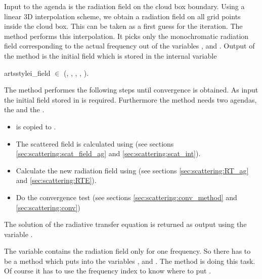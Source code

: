 
Input to the agenda is the radiation field on the cloud
box boundary.
Using a linear 3D interpolation scheme, we obtain a
radiation field on all grid points inside the cloud box.
This can be taken as a first guess for the iteration. The method
 performs this
interpolation. It picks only the monochromatic radiation field
corresponding to the actual frequency out of the variables
,  and
. Output of the method is the initial field 
which is stored in the internal variable
\begin{center}
  artsstyle{i\_field} $\in$ (\ScaP, \ScaLat, \ScaLon, \ScaZa,
\ScaAa). 
\end{center}


The method  performes the following steps 
until convergence is obtained. As input the initial field stored in
 is required. Furthermore the method needs two
agendas, the  and the
.

\begin{itemize}
\item {} is copied to .
\item The scattered field is calculated using
    (see sections \ref{sec:scattering:scat_field_ag} and
    \ref{sec:scattering:scat_int}).
\item Calculate the new radiation field using
 (see sections \ref{sec:scattering:RT_ag} and
  \ref{sec:scattering:RTE}).
\item Do the convergence test (see sections
  \ref{sec:scattering:conv_method} and \ref{sec:scattering:conv})
\end{itemize}
The solution of the radiative transfer equation is returned as output
using the variable . 

The variable  contains the radiation field only
for one frequency. So there has to be a method which puts
 into the variables ,
 and . The method
 is doing this task.
Of course it has to use the frequency index to know where
to put .
 

